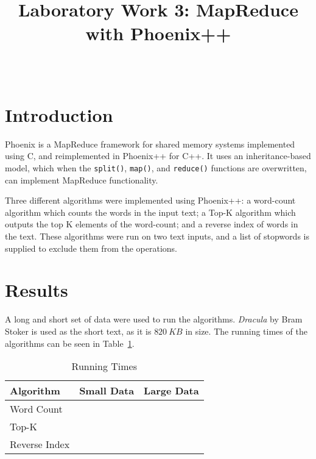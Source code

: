 \documentclass[12pt,onecolumn]{IEEEtran}
\begin{document}
	\title{Laboratory Work 3: MapReduce with Phoenix++}
	
	\author{\\
		}
	
	\maketitle
	\thispagestyle{empty}
	
	\section{Introduction}
	
	Phoenix is a MapReduce framework for shared memory systems implemented using C, and reimplemented in Phoenix++ for C++. It uses an inheritance-based model, which when the \verb|split()|, \verb|map()|, and \verb|reduce()| functions are overwritten, can implement MapReduce functionality.
	
	Three different algorithms were implemented using Phoenix++: a word-count algorithm which counts the words in the input text; a Top-K algorithm which outputs the top K elements of the word-count; and a reverse index of words in the text. These algorithms were run on two text inputs, and a list of stopwords is supplied to exclude them from the operations.
	
	\section{Results}
	
	A long and short set of data were used to run the algorithms. \textit{Dracula} by Bram Stoker is used as the short text, as it is $820~KB$ in size. 
	The running times of the algorithms can be seen in Table~\ref{tbl:time}.
	
	\begin{table}[h]
		\centering \caption{Running Times} \label{tbl:time}
		\begin{tabular}{lll}
			\hline
			Algorithm     & Small Data & Large Data \\ \hline
			Word Count    &            &            \\
			Top-K         &            &            \\
			Reverse Index &            &            \\ \hline
		\end{tabular}
	\end{table}
\end{document}
